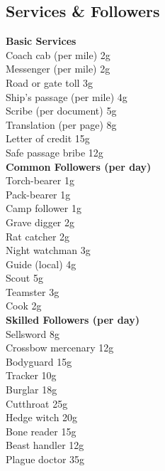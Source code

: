 \documentclass[10pt,twoside]{article}
\begin{document}
\subsection{Services \& Followers}

\begin{multicols}{2}
\textbf{Basic Services} \\
Coach cab (per mile) \dotfill 2g \\
Messenger (per mile) \dotfill 2g \\
Road or gate toll \dotfill 3g \\
Ship's passage (per mile) \dotfill 4g \\
Scribe (per document) \dotfill 5g \\
Translation (per page) \dotfill 8g \\
Letter of credit \dotfill 15g \\
Safe passage bribe \dotfill 12g \\

\textbf{Common Followers (per day)} \\
Torch-bearer \dotfill 1g \\
Pack-bearer \dotfill 1g \\
Camp follower \dotfill 1g \\
Grave digger \dotfill 2g \\
Rat catcher \dotfill 2g \\
Night watchman \dotfill 3g \\
Guide (local) \dotfill 4g \\
Scout \dotfill 5g \\
Teamster \dotfill 3g \\
Cook \dotfill 2g \\

\textbf{Skilled Followers (per day)} \\
Sellsword \dotfill 8g \\
Crossbow mercenary \dotfill 12g \\
Bodyguard \dotfill 15g \\
Tracker \dotfill 10g \\
Burglar \dotfill 18g \\
Cutthroat \dotfill 25g \\
Hedge witch \dotfill 20g \\
Bone reader \dotfill 15g \\
Beast handler \dotfill 12g \\
Plague doctor \dotfill 35g \\

\columnbreak


\end{multicols}
\end{document}
